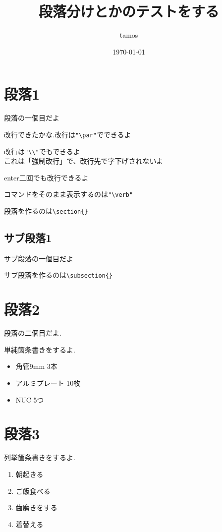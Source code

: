 \documentclass[a4paper,11pt]{jsarticle}
\begin{document}
\title{段落分けとかのテストをする}
\author{tamos}
\date{\today}
\maketitle


\section{段落1}
段落の一個目だよ
\par
改行できたかな.改行は\verb|"\par"|でできるよ
\par
改行は\verb|"\\"|でもできるよ\\
これは「強制改行」で、改行先で字下げされないよ


enter二回でも改行できるよ
\par
コマンドをそのまま表示するのは\verb|"\verb"|
\par
段落を作るのは\verb|\section{}|
\subsection{サブ段落1}
サブ段落の一個目だよ
\par
サブ段落を作るのは\verb|\subsection{}|
\section{段落2}
段落の二個目だよ.
\par
単純箇条書きをするよ.
\begin{itemize}
\item 角管9mm 3本
\item アルミプレート 10枚
\item NUC 5つ
\end{itemize}
\par
\newpage
\section{段落3}
列挙箇条書きをするよ.
\begin{enumerate}
  \item 朝起きる
  \item ご飯食べる
  \item 歯磨きをする
  \item 着替える
\end{enumerate}
\end{document}

